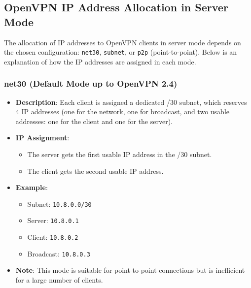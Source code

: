 \subsection{OpenVPN IP Address Allocation in Server Mode}

The allocation of IP addresses to OpenVPN clients in server mode depends on the chosen configuration: \texttt{net30}, \texttt{subnet}, or \texttt{p2p} (point-to-point). Below is an explanation of how the IP addresses are assigned in each mode.

\subsubsection{net30 (Default Mode up to OpenVPN 2.4)}
\begin{itemize}
    \item \textbf{Description}: Each client is assigned a dedicated /30 subnet, which reserves 4 IP addresses (one for the network, one for broadcast, and two usable addresses: one for the client and one for the server).
    \item \textbf{IP Assignment}:
    \begin{itemize}
        \item The server gets the first usable IP address in the /30 subnet.
        \item The client gets the second usable IP address.
    \end{itemize}
    \item \textbf{Example}:
    \begin{itemize}
        \item Subnet: \texttt{10.8.0.0/30}
        \item Server: \texttt{10.8.0.1}
        \item Client: \texttt{10.8.0.2}
        \item Broadcast: \texttt{10.8.0.3}
    \end{itemize}
    \item \textbf{Note}: This mode is suitable for point-to-point connections but is inefficient for a large number of clients.
\end{itemize}

